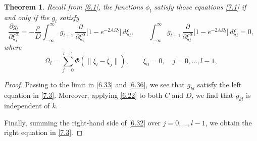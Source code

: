 \documentclass[11pt]{article}
\newtheorem{theorem}{Theorem}
\begin{document}
\vspace{0.5em}
\noindent
\begin{theorem}\label{thm:gl}
    Recall from \eqref{6.1}, the functions $\phi_l$ satisfy those equations \eqref{7.1}
if and only if the $g_l$ satisfy
\begin{equation}
\frac{\partial g_l}{\partial \xi_i^\alpha}
  = -\frac{\rho}{D} \int_{-\infty}^{\infty}
    g_{l+1} \, \frac{\partial}{\partial \xi_i^\alpha}
    \bigl[ 1 - e^{-2A\Omega_l} \bigr] \, d\xi_{l},
  \qquad
  \int_{-\infty}^{\infty}
    g_{l+1} \, \frac{\partial}{\partial \xi_l^\alpha}
    \bigl[ 1 - e^{-2A\Omega_l} \bigr] \, d\xi_l = 0,
  \tag{7.3}\label{7.3}
\end{equation}
where
\[
  \Omega_l = \sum_{j=0}^{l-1} \Phi(\|\xi_l - \xi_j\|),
  \qquad
  \xi_0 = 0, \quad j = 0, \dots, l-1,
\]
\end{theorem}

\begin{proof}
    Passing to the limit in \eqref{6.33} and \eqref{6.36}, we see that $g_{kl}$ satisfy the left equation in \eqref{7.3}. Moreover, applying \eqref{6.22}
to both $C$ and $D$, we find that $g_{kl}$ is independent of $k$.

Finally, summing the right-hand side of \eqref{6.32} over $j=0,\dots,l-1$,
we obtain the right equation in \eqref{7.3}.
\end{proof}
\end{document}
